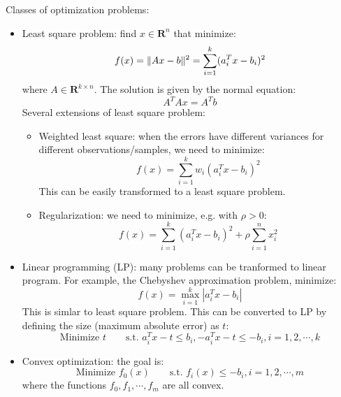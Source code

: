 \documentclass{report}
\begin{document}
Classes of optimization problems:
\begin{itemize}
\item Least square problem: find $x \in \textbf{R}^n$ that minimize: 
\begin{equation}
f(x) = \lVert Ax - b\rVert^2 = \sum_{i=1}^k (a_i^T x - b_i)^2
\end{equation}
where $A \in \textbf{R}^{k \times n}$. The solution is given by the normal equation: 
\begin{equation}
A^T A x = A^T b	
\end{equation}
Several extensions of least square problem: 
\begin{itemize}
\item Weighted least square: when the errors have different variances for different observations/samples, we need to minimize: 
\begin{equation}
f(x) = \sum_{i=1}^k w_i (a_i^T x - b_i)^2
\end{equation}
This can be easily transformed to a least square problem. 

\item Regularization: we need to minimize, e.g. with $\rho > 0$: 
\begin{equation}
f(x) = \sum_{i=1}^k (a_i^T x - b_i)^2 + \rho \sum_{i=1}^n x_i^2
\end{equation}
\end{itemize}

\item Linear programming (LP): many problems can be tranformed to linear program. For example, the Chebyshev approximation problem, minimize: 
\begin{equation}
f(x) = \max_{i=1}^k |a_i^T x - b_i|	
\end{equation}
This is simlar to least square problem. This can be converted to LP by defining the size (maximum absolute error) as $t$:
\begin{equation}
\text{Minimize } t \qquad \text{s.t. } a_i^T x - t \leq b_i, -a_i^T x - t \leq -b_i, i = 1, 2, \cdots, k
\end{equation}

\item Convex optimization: the goal is: 
\begin{equation}
\text{Minimize } f_0(x) \qquad \text{s.t. } f_i(x) \leq -b_i, i = 1, 2, \cdots, m
\end{equation}
where the functions $f_0, f_1, \cdots, f_m$ are all convex. 
\end{itemize}
\end{document}
